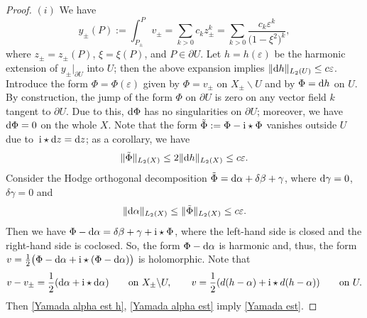 \documentclass[pdftex]{sigma}
\numberwithin{equation}{section}
\theoremstyle{definition}
\begin{document}
\begin{proof}
$(i)$ We have
\begin{equation}
\label{Yamada y}
y_{\pm}(P):=\int_{P_\pm}^P v_\pm=\sum_{k>0}c_{k}z_\pm^{k}=\sum_{k>0}\frac{c_{k}\varepsilon^{k}}{\bigl(1-\xi^2\bigr)^k},
\end{equation}
where $z_\pm=z_\pm(P)$, $\xi=\xi(P)$, and $P\in \partial U$.
Let $h=h(\varepsilon)$ be the harmonic extension of $y_\pm|_{\partial U}$ into $U$; then the above expansion implies $\|{\rm d}h\|_{L_{2}(U)}\le c\varepsilon$. Introduce the form $\Phi=\Phi(\varepsilon)$ given by $\Phi=v_\pm$ on $X_\pm\backslash U$ and by $\Phi={\rm d}h$ on $U$. By construction, the jump of the form $\Phi$ on $\partial U$ is zero on any vector field $k$ tangent to $\partial U$. Due to this, ${\rm d}\Phi$ has no singularities on $\partial U$; moreover, we have ${\rm d}\Phi=0$ on the whole $X$. Note that the form $\tilde{\Phi}:=\Phi-{\rm i}\star\Phi$ vanishes outside $U$ due to~${{\rm i}\star {\rm d}z={\rm d}z}$; as a corollary, we have
\begin{equation}
\label{Yamada alpha est h}
\|\tilde{\Phi}\|_{L_2(X)}\le 2\|{\rm d}h\|_{L_2(X)}\le c\varepsilon.
\end{equation}
Consider the Hodge orthogonal decomposition $\tilde{\Phi}={\rm d}\alpha+\delta\beta+\gamma$, where ${\rm d}\gamma=0$, $\delta\gamma=0$ and
\begin{equation}
\label{Yamada alpha est}
\|{\rm d}\alpha\|_{L_2(X)}\le\|\tilde{\Phi}\|_{L_2(X)}\le c\varepsilon.
\end{equation}
Then we have
$\Phi-{\rm d}\alpha=\delta\beta+\gamma+{\rm i}\star\Phi$,
where the left-hand side is closed and the right-hand side is coclosed. So, the form $\Phi-{\rm d}\alpha$ is harmonic and, thus, the form
$v=\frac{1}{2}\bigl(\Phi-{\rm d}\alpha+{\rm i}\star(\Phi-{\rm d}\alpha)\bigr)$
is holomorphic. Note that
\[v-v_\pm=\frac{1}{2}({\rm d}\alpha+{\rm i}\star {\rm d}\alpha) \qquad\text{on}\ X_\pm\backslash U, \qquad v=\frac{1}{2}( d(h-\alpha)+{\rm i}\star d(h-\alpha)) \qquad\text{on}\ U.\]
Then \eqref{Yamada alpha est h}, \eqref{Yamada alpha est} imply \eqref{Yamada est}.


\end{proof}
\end{document}
